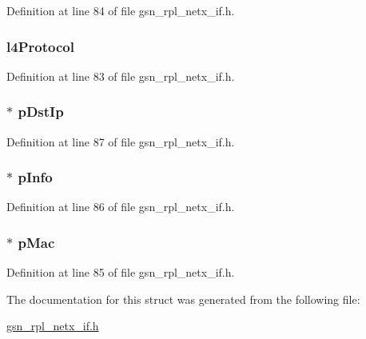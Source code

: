 Definition at line 84 of file gsn\_\-rpl\_\-netx\_\-if.h.

\hypertarget{a00211_a443980e432355afdf3da81556fc820d7}{
\subsubsection[{l4Protocol}]{ {\bf l4Protocol}}}
\label{a00211_a443980e432355afdf3da81556fc820d7}


Definition at line 83 of file gsn\_\-rpl\_\-netx\_\-if.h.

\hypertarget{a00211_aaf13a81e05b57b57dd506f8dbf18026c}{
\subsubsection[{pDstIp}]{$\ast$ {\bf pDstIp}}}
\label{a00211_aaf13a81e05b57b57dd506f8dbf18026c}


Definition at line 87 of file gsn\_\-rpl\_\-netx\_\-if.h.

\hypertarget{a00211_a24c66f5468b12f00f3e7857a6845fcb8}{
\subsubsection[{pInfo}]{$\ast$ {\bf pInfo}}}
\label{a00211_a24c66f5468b12f00f3e7857a6845fcb8}


Definition at line 86 of file gsn\_\-rpl\_\-netx\_\-if.h.

\hypertarget{a00211_aadb0c05fc645250e90101a10dfa4b7b8}{
\subsubsection[{pMac}]{$\ast$ {\bf pMac}}}
\label{a00211_aadb0c05fc645250e90101a10dfa4b7b8}


Definition at line 85 of file gsn\_\-rpl\_\-netx\_\-if.h.



The documentation for this struct was generated from the following file:\begin{DoxyCompactItemize}
\item 
\hyperlink{a00580}{gsn\_\-rpl\_\-netx\_\-if.h}\end{DoxyCompactItemize}
